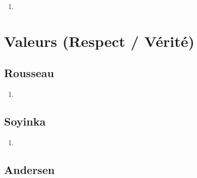 \documentclass[a4paper, 11pt, hidelinks]{article}
\begin{document}
\begin{enumerate}
    \item 
\end{enumerate}



























\section{Valeurs (Respect / Vérité)}



\subsection{Rousseau}


\begin{enumerate}
    \item 
\end{enumerate}



\subsection{Soyinka}


\begin{enumerate}
    \item 
\end{enumerate}




\subsection{Andersen}
\end{document}
